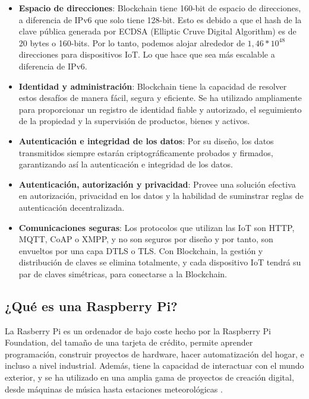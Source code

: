 \begin{itemize}
    \item \textbf{Espacio de direcciones}: Blockchain tiene 160-bit de espacio de direcciones, a diferencia de IPv6
    que solo tiene 128-bit. Esto es debido a que el hash de la clave pública generada por ECDSA (Elliptic Cruve Digital
    Algorithm) es de 20 bytes o 160-bits. Por lo tanto, podemos alojar alrededor de \(1,46*10^{48}\) direcciones para 
    dispositivos IoT. Lo que hace que sea más escalable a diferencia de IPv6. 
    \item \textbf{Identidad y administración}: Blockchain tiene la capacidad de resolver estos desafíos de manera fácil, 
    segura y eficiente. Se ha utilizado ampliamente para proporcionar un registro de identidad fiable y autorizado, 
    el seguimiento de la propiedad y la supervisión de productos, bienes y activos.
    \item \textbf{Autenticación e integridad de los datos}: Por su diseño, los datos transmitidos siempre estarán
    criptográficamente probados y firmados, garantizando así la autenticación e integridad de los datos.
    \item \textbf{Autenticación, autorización y privacidad}: Provee una solución efectiva en autorización, privacidad en
    los datos y la habilidad de suminstrar reglas de autenticación decentralizada. 
    \item \textbf{Comunicaciones seguras}: Los protocolos que utilizan las IoT son HTTP, MQTT, CoAP o XMPP, y no son 
    seguros por diseño y por tanto, son envueltos por una capa DTLS o TLS. Con Blockchain, la gestión y distribución 
    de claves se elimina totalmente, y cada dispositivo IoT tendrá su par de claves simétricas, para conectarse a la 
    Blockchain.
\end{itemize}

\subsection{¿Qué es una Raspberry Pi?}

La Rasberry Pi es un ordenador de bajo coste hecho por la Raspberry Pi Foundation, del tamaño de una tarjeta de crédito, 
permite aprender programación, construir proyectos de hardware, hacer automatización del hogar, e incluso a nivel 
industrial. Además, tiene la capacidad de interactuar con el mundo exterior, y se ha utilizado en una amplia gama de 
proyectos de creación digital, desde máquinas de música hasta estaciones meteorológicas \cite{what-is-rasp}.

